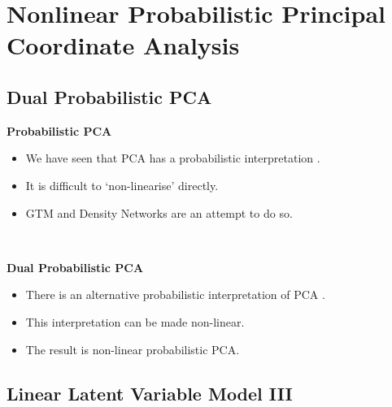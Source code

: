 \chapter{Nonlinear Probabilistic Principal Coordinate Analysis}

\section{Dual Probabilistic PCA}


\textbf{Probabilistic PCA}
\begin{itemize}
\item We have seen that PCA has a probabilistic interpretation \cite{Tipping:probpca99}.
\item It is difficult to `non-linearise' directly.
\item GTM and Density Networks are an attempt to do so.
\end{itemize}
~

\textbf{Dual Probabilistic PCA}
\begin{itemize}
\item There is an alternative probabilistic interpretation of PCA \cite{Lawrence:pnpca05}.
\item This interpretation can be made non-linear.
\item The result is non-linear probabilistic PCA.
\end{itemize}

\section{Linear Latent Variable Model III}



